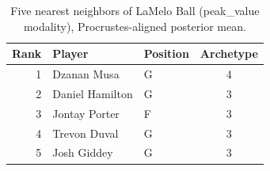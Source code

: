 \begin{table}[htbp]
  \centering\small
  \begin{tabular}{rllc}
    \toprule
    Rank & Player & Position & Archetype \\
    \midrule
    1 & Dzanan Musa & G & 4 \\
    2 & Daniel Hamilton & G & 3 \\
    3 & Jontay Porter & F & 3 \\
    4 & Trevon Duval & G & 3 \\
    5 & Josh Giddey & G & 3 \\
    \bottomrule
  \end{tabular}
  \caption{Five nearest neighbors of LaMelo Ball (peak_value modality), Procrustes-aligned posterior mean.}
  \label{tab:LaMelo_Ball_neighbors_peak_value}
\end{table}

